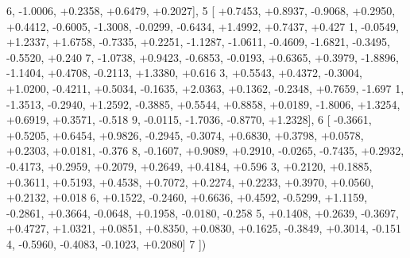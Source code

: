 \begin{DoxyCode}
      6, -1.0006, +0.2358, +0.6479, +0.2027],
5 [ +0.7453, +0.8937, -0.9068, +0.2950, +0.4412, -0.6005, -1.3008, -0.0299, -0.6434, +1.4992, +0.7437, +0.427
      1, -0.0549, +1.2337, +1.6758, -0.7335, +0.2251, -1.1287, -1.0611, -0.4609, -1.6821, -0.3495, -0.5520, +0.240
      7, -1.0738, +0.9423, -0.6853, -0.0193, +0.6365, +0.3979, -1.8896, -1.1404, +0.4708, -0.2113, +1.3380, +0.616
      3, +0.5543, +0.4372, -0.3004, +1.0200, -0.4211, +0.5034, -0.1635, +2.0363, +0.1362, -0.2348, +0.7659, -1.697
      1, -1.3513, -0.2940, +1.2592, -0.3885, +0.5544, +0.8858, +0.0189, -1.8006, +1.3254, +0.6919, +0.3571, -0.518
      9, -0.0115, -1.7036, -0.8770, +1.2328],
6 [ -0.3661, +0.5205, +0.6454, +0.9826, -0.2945, -0.3074, +0.6830, +0.3798, +0.0578, +0.2303, +0.0181, -0.376
      8, -0.1607, +0.9089, +0.2910, -0.0265, -0.7435, +0.2932, -0.4173, +0.2959, +0.2079, +0.2649, +0.4184, +0.596
      3, +0.2120, +0.1885, +0.3611, +0.5193, +0.4538, +0.7072, +0.2274, +0.2233, +0.3970, +0.0560, +0.2132, +0.018
      6, +0.1522, -0.2460, +0.6636, +0.4592, -0.5299, +1.1159, -0.2861, +0.3664, -0.0648, +0.1958, -0.0180, -0.258
      5, +0.1408, +0.2639, -0.3697, +0.4727, +1.0321, +0.0851, +0.8350, +0.0830, +0.1625, -0.3849, +0.3014, -0.151
      4, -0.5960, -0.4083, -0.1023, +0.2080]
7 ])
\end{DoxyCode}
